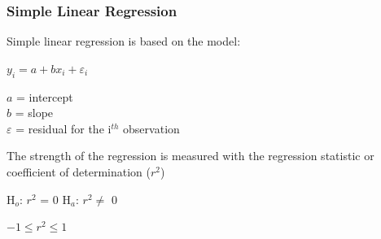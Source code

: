 \documentclass[10pt]{beamer}
\begin{document}




\begin{frame}[fragile]
\frametitle{Simple Linear Regression}

\bi
\item Simple linear regression is based on the  model: 

\hspace{5ex}$y_{i} = a + bx_{i} + \varepsilon_{i}$

\hspace{10ex}$a$ = intercept\\
\hspace{10ex}$b$ = slope\\
\hspace{10ex}$\varepsilon$ = residual for the i$^{th}$ observation

\item The strength of the regression is measured with the
  regression statistic or coefficient of determination ($r^2$)

\item H$_{o}$: $r^2$ = 0 \hspace{0.5in} H$_{a}$: $r^2\neq$ 0

\item $-1 \le r^2 \le 1$
\ei
\end{frame}
\end{document}
